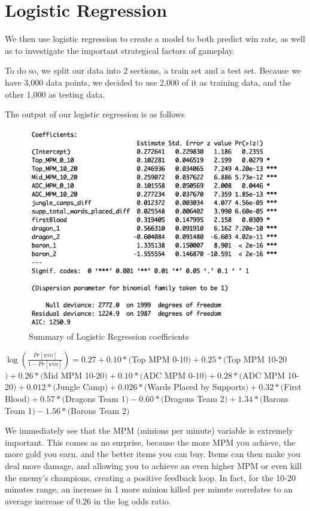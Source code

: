 \documentclass[runningheads]{llncs}
\begin{document}
	\section{Logistic Regression}
	
	We then use logistic regression to create a model to both predict win rate, as well as to investigate the important strategical factors of gameplay.
	
	To do so, we split our data into 2 sections, a train set and a test set. Because we have 3,000 data points, we decided to use 2,000 of it as training data, and the other 1,000 as testing data.

	The output of our logistic regression is as follows

	\begin{figure}[!htb]
		\centering
		\includegraphics[width=\textwidth]{images/lr_summary.png}
		\caption{Summary of Logistic Regression coefficients}
	\end{figure}
	
	$\log(\frac{Pr[win]}{1 - Pr[win]}) = 0.27 + 0.10 * ($Top MPM 0-10$) + 0.25 * ($Top MPM 10-20$) + 0.26 * ($Mid MPM 10-20$) + 0.10 * ($ADC MPM 0-10$) + 0.28 * ($ADC MPM 10-20$) + 0.012 * ($Jungle Camp$) + 0.026 * ($Wards Placed by Supports$) + 0.32 * ($First Blood$) + 0.57 * ($Dragons Team 1$) - 0.60 * ($Dragons Team 2$) + 1.34 * ($Barons Team 1$) - 1.56 * ($Barons Team 2$)$
	
	
	We immediately see that the MPM (minions per minute) variable is extremely important. This comes as no surprise, because the more MPM you achieve, the more gold you earn, and the better items you can buy. Items can then make you deal more damage, and allowing you to achieve an even higher MPM or even kill the enemy’s champions, creating a positive feedback loop. In fact, for the 10-20 minutes range, an increase in 1 more minion killed per minute correlates to an average increase of 0.26 in the log odds ratio.
\end{document}
